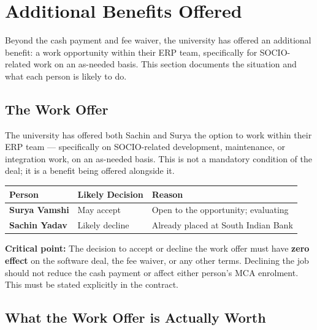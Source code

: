 \documentclass[12pt,a4paper]{article}
\begin{document}
\section{Additional Benefits Offered}

\begin{infobox}
Beyond the cash payment and fee waiver, the university has offered an additional benefit: a work opportunity within their ERP team, specifically for SOCIO-related work on an as-needed basis. This section documents the situation and what each person is likely to do.
\end{infobox}

\vspace{0.4cm}

\subsection{The Work Offer}

The university has offered both Sachin and Surya the option to work within their ERP team — specifically on SOCIO-related development, maintenance, or integration work, on an as-needed basis. This is not a mandatory condition of the deal; it is a benefit being offered alongside it.

\begin{tabularx}{\textwidth}{L{3.5cm} L{2.5cm} X}
\toprule
{}
\textbf{Person} & \textbf{Likely Decision} & \textbf{Reason} \\
\midrule
\textbf{Surya Vamshi} & May accept & Open to the opportunity; evaluating \\
\textbf{Sachin Yadav} & Likely decline & Already placed at South Indian Bank \\
\bottomrule
\end{tabularx}

\vspace{0.4cm}

\begin{warnbox}
\textbf{Critical point:} The decision to accept or decline the work offer must have \textbf{zero effect} on the software deal, the fee waiver, or any other terms. Declining the job should not reduce the cash payment or affect either person's MCA enrolment. This must be stated explicitly in the contract.
\end{warnbox}

\vspace{0.4cm}

\subsection{What the Work Offer is Actually Worth}
\end{document}
